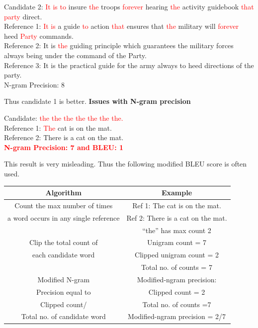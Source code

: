 \documentclass[a4paper]{article}
\newcommand{\red}[1]{\textcolor{red}{#1}}
\begin{document}
Candidate 2: \red{It is to} insure \red {the} troops \red {forever} hearing \red
{the} activity guidebook \red{that party} direct. \\
Reference 1: \red {It is} a guide \red {to} action \red {that} ensures that \red
{the} military will  \red{forever} heed \red{Party} commands. \\ Reference 2: It
is \red{the} guiding principle which guarantees the
military forces always being under the command of the Party. \\ Reference 3:  It
is the practical guide for the army always to heed directions of the party. \\
N-gram Precision: 8


Thus candidate 1 is better.
\textbf{Issues with N-gram precision}


Candidate: \red{the the the the the the the.} \\
Reference 1: \red{The} cat is on the mat. \\
Reference 2: There is a cat on the mat. \\


\textbf{\red{N-gram Precision: 7 and BLEU: 1}}


This result is  very misleading. Thus the following modified BLEU score is often
used.


\begin{table}[h]
  \centering
  \begin{tabular}{|c|c|}
    \hline

    \textbf{Algorithm}  & \textbf{Example}  \\

    \hline

    Count the max number of times & Ref 1: The cat is on the mat.  \\
    a word occurs in any single reference & Ref 2: There is a cat on the mat. \\
    & “the” has max count 2 \\

    \hline

    Clip the total count of & Unigram count = 7 \\
    each candidate word & Clipped unigram count = 2 \\
    &Total no. of counts = 7 \\

    \hline

    Modified N-gram & Modified-ngram precision: \\
    Precision equal to & Clipped count = 2 \\
    Clipped count/ & Total no. of counts =7 \\
    Total no. of candidate word & Modified-ngram precision = 2/7\\

    \hline
  \end{tabular}
\end{table}
\end{document}
